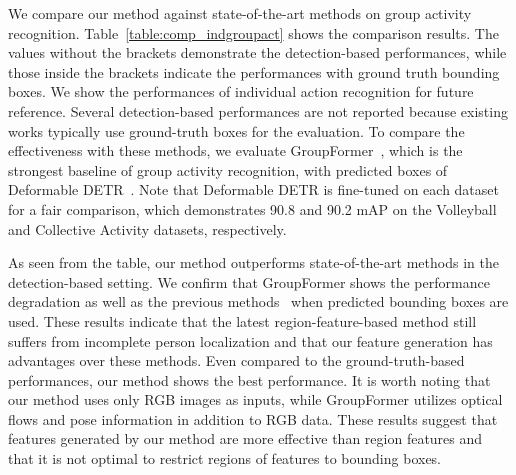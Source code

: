 \documentclass[runningheads]{llncs}
\begin{document}
We compare our method against state-of-the-art methods on group activity recognition. Table~\ref{table:comp_indgroupact} shows the comparison results. The values without the brackets demonstrate the detection-based performances, while those inside the brackets indicate the performances with ground truth bounding boxes. We show the performances of individual action recognition for future reference. Several detection-based performances are not reported because existing works typically use ground-truth boxes for the evaluation. To compare the effectiveness with these methods, we evaluate GroupFormer~\cite{li_iccv2021}, which is the strongest baseline of group activity recognition, with predicted boxes of Deformable DETR~\cite{zhu_iclr2021}. Note that Deformable DETR is fine-tuned on each dataset for a fair comparison, which demonstrates 90.8 and 90.2 mAP on the Volleyball and Collective Activity datasets, respectively.

As seen from the table, our method outperforms state-of-the-art methods in the detection-based setting. We confirm that GroupFormer shows the performance degradation as well as the previous methods~\cite{bagautdinov_cvpr2017,qi_eccv2018,wu_cvpr2019,ehsanpour_eccv2020} when predicted bounding boxes are used. These results indicate that the latest region-feature-based method still suffers from incomplete person localization and that our feature generation has advantages over these methods.
Even compared to the ground-truth-based performances, our method shows the best performance. It is worth noting that our method uses only RGB images as inputs, while GroupFormer utilizes optical flows and pose information in addition to RGB data. These results suggest that features generated by our method are more effective than region features and that it is not optimal to restrict regions of features to bounding boxes.
\end{document}
